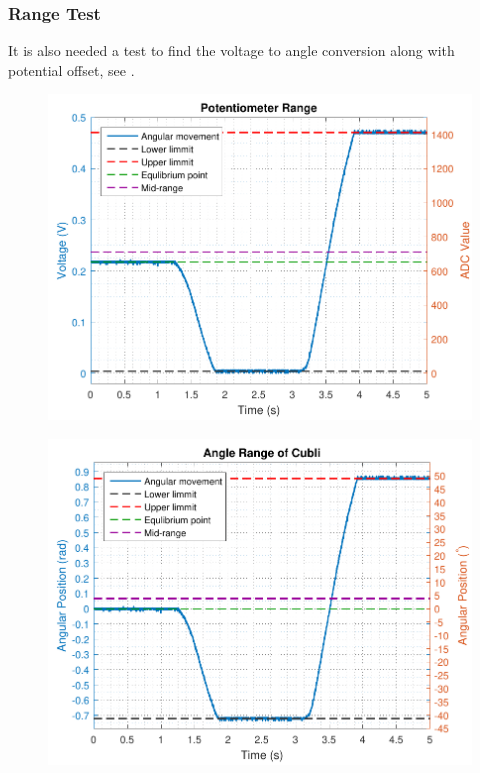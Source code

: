 \subsubsection{Range Test}
It is also needed a test to find the voltage to angle conversion along with potential offset, see .

\begin{minipage}{\linewidth}
  	\begin{minipage}{0.45\linewidth}
  		\begin{figure}[H]
  			\includegraphics[scale=.5]{figures/PotentiometerResolution}
  			\centering
  			\captionsetup{justification=centering}
  			\label{PotentiometerResolution}
  		\end{figure}\vspace{-5mm}
  	\end{minipage}
  	\hspace{0.03\linewidth}
  	\begin{minipage}{0.45\linewidth}
  		\begin{figure}[H]
  			\includegraphics[scale=.5]{figures/PotentiometerResolutionDegRad}

\end{figure}
\end{minipage}
\end{minipage}
